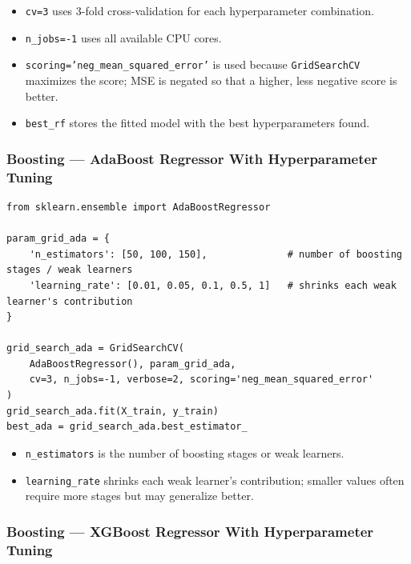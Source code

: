 \documentclass[12pt,openany]{book}
\begin{document}
\begin{itemize}[leftmargin=*]
    \item \texttt{cv=3} uses 3-fold cross-validation for each hyperparameter combination.
    \item \texttt{n\_jobs=-1} uses all available CPU cores.
    \item \texttt{scoring='neg\_mean\_squared\_error'} is used because \texttt{GridSearchCV} maximizes the score; MSE is negated so that a higher, less negative score is better.
    \item \texttt{best\_rf} stores the fitted model with the best hyperparameters found.
\end{itemize}

\subsubsection{Boosting --- AdaBoost Regressor With Hyperparameter Tuning}

\begin{Verbatim}[breaklines=true,breakanywhere=true,fontsize=\small]
from sklearn.ensemble import AdaBoostRegressor

param_grid_ada = {
    'n_estimators': [50, 100, 150],              # number of boosting stages / weak learners
    'learning_rate': [0.01, 0.05, 0.1, 0.5, 1]   # shrinks each weak learner's contribution
}

grid_search_ada = GridSearchCV(
    AdaBoostRegressor(), param_grid_ada,
    cv=3, n_jobs=-1, verbose=2, scoring='neg_mean_squared_error'
)
grid_search_ada.fit(X_train, y_train)
best_ada = grid_search_ada.best_estimator_
\end{Verbatim}

\begin{itemize}[leftmargin=*]
    \item \texttt{n\_estimators} is the number of boosting stages or weak learners.
    \item \texttt{learning\_rate} shrinks each weak learner's contribution; smaller values often require more stages but may generalize better.
\end{itemize}

\subsubsection{Boosting --- XGBoost Regressor With Hyperparameter Tuning}
\end{document}
